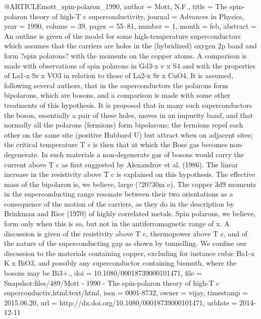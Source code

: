 @ARTICLE{mott_spin-polaron_1990,
  author = {Mott, N.F.},
  title = {The spin-polaron theory of high-{T} c superconductivity},
  journal = {Advances in Physics},
  year = {1990},
  volume = {39},
  pages = {55--81},
  number = {1},
  month = feb,
  abstract = {An outline is given of the model for some high-temperature superconductors
	which assumes that the carriers are holes in the (hybridized) oxygen
	2p band and form ?spin polarons? with the moments on the copper atoms.
	A comparison is made with observations of spin polarons in Gd3-x
	v x S4 and with the properties of La1-x Sr x VO3 in relation to those
	of La2-x Sr x CuO4. It is assumed, following several authors, that
	in the superconductors the polarons form bipolarons, which are bosons,
	and a comparison is made with some other treatments of this hypothesis.
	It is proposed that in many such superconductors the boson, essentially
	a pair of these holes, moves in an impurity band, and that normally
	all the polarons (fermions) form bipolarons; the fermions repel each
	other on the same site (positive Hubbard U) but attract when on adjacent
	sites; the critical temperature T c is then that at which the Bose
	gas becomes non-degenerate. In such materials a non-degenerate gas
	of bosons would carry the current above T c as first suggested by
	Alexandrov et al. (1986). The linear increase in the resistivity
	above T c is explained on this hypothesis. The effective mass of
	the bipolaron is, we believe, large (?20?30m e). The copper 3d9 moments
	in the superconducting range resonate between their two orientations
	as a consequence of the motion of the carriers, as they do in the
	description by Brinkman and Rice (1970) of highly correlated metals.
	Spin polarons, we believe, form only when this is so, but not in
	the antiferromagnetic range of x. A discussion is given of the resistivity
	above T c, thermopower above T c, and of the nature of the superconducting
	gap as shown by tunnelling. We confine our discussion to the materials
	containing copper, excluding for instance cubic Ba1-x K x BiO3, and
	possibly any superconductor containing bismuth, where the bosons
	may be Bi3+.},
  doi = {10.1080/00018739000101471},
  file = {Snapshot:files/489/Mott - 1990 - The spin-polaron theory of high-T c superconductiv.html:text/html},
  issn = {0001-8732},
  owner = {vijay},
  timestamp = {2015.06.20},
  url = {http://dx.doi.org/10.1080/00018739000101471},
  urldate = {2014-12-11}
}

